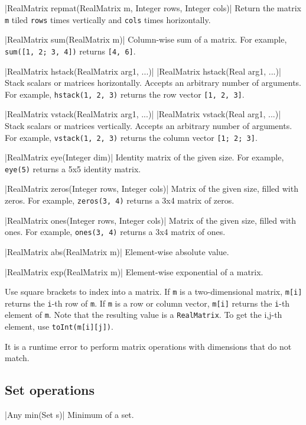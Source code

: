 \blog|RealMatrix repmat(RealMatrix m, Integer rows, Integer cols)|
\myindent Return the matrix \verb|m| tiled \verb|rows| times vertically and
\verb|cols|
times horizontally.

\blog|RealMatrix sum(RealMatrix m)|
\myindent Column-wise sum of a matrix.
For example, \verb|sum([1, 2; 3, 4])| returns \verb|[4, 6]|.

\blog|RealMatrix hstack(RealMatrix arg1, ...)|
\blog|RealMatrix hstack(Real arg1, ...)|
\myindent Stack scalars or matrices horizontally. Accepts an arbitrary number
of
arguments.
For example, \verb|hstack(1, 2, 3)| returns the row vector {\tt [1, 2, 3]}.

\blog|RealMatrix vstack(RealMatrix arg1, ...)|
\blog|RealMatrix vstack(Real arg1, ...)|
\myindent Stack scalars or matrices vertically. Accepts an arbitrary number of
arguments.
For example, \verb|vstack(1, 2, 3)| returns the column vector {\tt [1; 2; 3]}.

\blog|RealMatrix eye(Integer dim)|
\myindent Identity matrix of the given size.
For example, \verb|eye(5)| returns a 5x5 identity matrix.

\blog|RealMatrix zeros(Integer rows, Integer cols)|
\myindent Matrix of the given size, filled with zeros.
For example, \verb|zeros(3, 4)| returns a 3x4 matrix of zeros.

\blog|RealMatrix ones(Integer rows, Integer cols)|
\myindent Matrix of the given size, filled with ones.
For example, \verb|ones(3, 4)| returns a 3x4 matrix of ones.

\blog|RealMatrix abs(RealMatrix m)|
\myindent Element-wise absolute value.

\blog|RealMatrix exp(RealMatrix m)|
\myindent Element-wise exponential of a matrix.

Use square brackets to index into a matrix. If \verb|m| is a two-dimensional
matrix, \verb|m[i]| returns the \verb|i|-th row of \verb|m|. If \verb|m| is a
row or column vector, \verb|m[i]| returns the \verb|i|-th element of \verb|m|.
Note that the resulting value is a \verb|RealMatrix|. To get the i,j-th
element, use \verb|toInt(m[i][j])|.

It is a runtime error to perform matrix operations with dimensions that do not
match.


\subsection{Set operations}
\label{sec:builtin-set-ops}

\blog|Any min(Set s)|
\myindent Minimum of a set.

